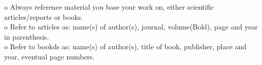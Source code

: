 \documentclass[ 12pt, a4paper ]{article}
\begin{document}
    o   Always reference material you base your work on, either scientific articles/reports
        or books. \\
    o   Refer to articles as: name(s) of author(s), journal, volume(Bold), page and year in
        parenthesis. \\
    o   Refer to bookds as: name(s) of author(s), title of book, publisher, place and year, 
        eventual page numbers. \\
\end{document}
